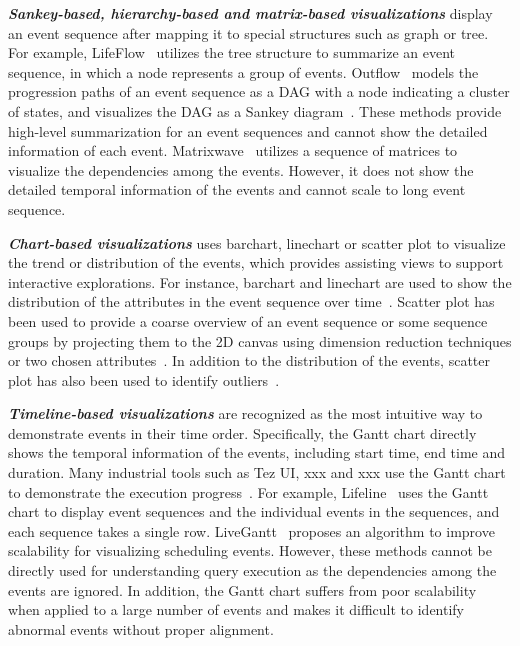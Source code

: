 \emph{\textbf{Sankey-based, hierarchy-based and matrix-based visualizations}} display an event sequence after mapping it to special structures such as graph or tree.
For example, LifeFlow~\cite{wongsuphasawat2011lifeflow} utilizes the tree structure to summarize an event sequence, in which a node represents a group of events. Outflow~\cite{wongsuphasawat2011outflow} models the progression paths of an event sequence as a DAG with a node indicating a cluster of states, and visualizes the DAG as a Sankey diagram~\cite{riehmann2005interactive}. These methods provide high-level summarization for an event sequences and cannot show the detailed information of each event. Matrixwave~\cite{zhao2015matrixwave} utilizes a sequence of matrices to visualize the dependencies among the events. However, it does not show the detailed temporal information of the events and cannot scale to long event sequence. 

\emph{\textbf{Chart-based visualizations}} uses barchart, linechart or scatter plot to visualize the trend or distribution of the events, which provides assisting views to support interactive explorations. For instance, barchart and linechart are used to show the distribution of the attributes in the event sequence over time~\cite{gotz2019visual, cappers2017exploring}. Scatter plot has been used to provide a coarse overview of an event sequence or some sequence groups by projecting them to the 2D canvas using dimension reduction techniques or two chosen attributes~\cite{wu2020visual, malik2016high, gotz2019visual}. In addition to the distribution of the events, scatter plot has also been used to identify outliers~\cite{}. 

\emph{\textbf{Timeline-based visualizations}} are recognized as the most intuitive way to demonstrate events in their time order. Specifically, the Gantt chart directly shows the temporal information of the events, including start time, end time and duration. Many industrial tools such as Tez UI, xxx and xxx use the Gantt chart to demonstrate the execution progress~\cite{}. For example, Lifeline~\cite{plaisant1996lifelines} uses the Gantt chart to display event sequences and the individual events in the sequences, and each sequence takes a single row. LiveGantt~\cite{jo2014livegantt} proposes an algorithm to improve scalability for visualizing scheduling events. However, these methods cannot be directly used for understanding query execution as the dependencies among the events are ignored. In addition, the Gantt chart suffers from poor scalability when applied to a large number of events and makes it difficult to identify abnormal events without proper alignment.
